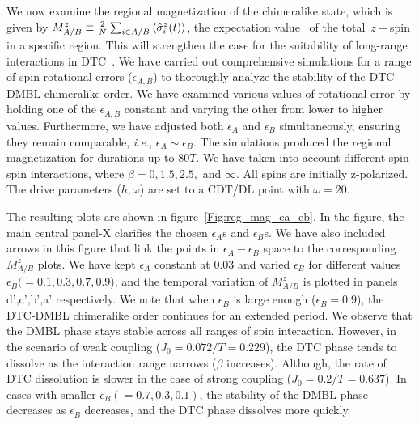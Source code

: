 \documentclass[12pt]{iopart}
\begin{document}
We now examine the regional magnetization of the chimeralike state, which is given by 
$M^z_{A/B}\equiv\frac{2}{N}\sum_{i\in{A/B}}\expval{\hat{\sigma}^z_i(t)}$, the expectation value  of the total $z-$spin in a specific region. This will strengthen the case for
the suitability of long-range interactions in DTC~\cite{sakurai_phys_nodate}. We have carried out comprehensive simulations for a range of spin rotational errors ($\epsilon_{{A,B}}$) to thoroughly analyze the stability of the DTC-DMBL chimeralike order. We have examined various values of rotational error by holding one of the $\epsilon{_{A,B}}$ constant and varying the other from lower to higher values. Furthermore, we have adjusted both $\epsilon_A$ and $\epsilon_B$ simultaneously, ensuring they remain comparable, \textit{i.e.}, $\epsilon_A \sim \epsilon_B$. The simulations produced the regional magnetization for durations up to $80T$. We have taken into account different spin-spin interactions, where $\beta = 0,1.5,2.5,$ and $\infty$. All spins are initially z-polarized. The drive parameters ($h,\omega$) are set to a CDT/DL point with $\omega =20$.
	
The resulting plots are shown in figure~\ref{Fig:reg_mag_ea_eb}. In the figure, the main central panel-X clarifies the chosen $\epsilon_A$s and $\epsilon_B$s. We have also included arrows in this figure that link the points in $\epsilon_A - \epsilon_B$ space to the corresponding $M^z_{A/B}$ plots. We have kept $\epsilon_{A}$ constant at 0.03 and varied $\epsilon_B$ for different values $\epsilon_B(= 0.1, 0.3, 0.7,0.9$), and the temporal variation of $M^z_{A/B}$ is plotted in panels d',c',b',a' respectively. We note that when $\epsilon_B$ is large enough ($\epsilon_B=0.9$), the DTC-DMBL chimeralike order continues for an extended period. We observe that the DMBL phase stays stable across all ranges of spin interaction. However, in the scenario of weak coupling ($J_0=0.072/T=0.229$), the DTC phase tends to dissolve as the interaction range narrows ($\beta$ increases). Although, the rate of DTC dissolution is slower in the case of strong coupling ($J_0=0.2/T=0.637$). In cases with smaller $\epsilon_B (=0.7,0.3,0.1)$, the stability of the DMBL phase decreases as $\epsilon_B$ decreases, and the DTC phase dissolves more quickly.
\end{document}
